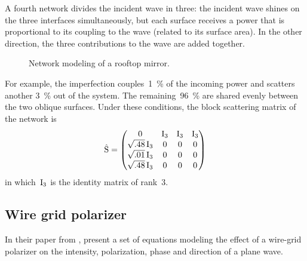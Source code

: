 A fourth network divides the incident wave in three: the incident wave shines on the three interfaces simultaneously, but each surface receives a power that is proportional to its coupling to the wave (related to its surface area).
In the other direction, the three contributions to the wave are added together.

\begin{figure}[hbtp]
    \centering
    
    \caption{Network modeling of a rooftop mirror.}
    \label{fig:rooftop_networks}
\end{figure}

For example, the imperfection couples~\SI{1}{\percent} of the incoming power and scatters another \SI{3}{\percent} out of the system.
The remaining~\SI{96}{\percent} are shared evenly between the two oblique surfaces.
Under these conditions, the block scattering matrix of the network is
\begin{equation}
    \hat{\mathrm{S}}
    =
    \begin{pmatrix}
        0                    & \mathrm{I}_3 & \mathrm{I}_3 & \mathrm{I}_3\\
        \sqrt{.48}\,\mathrm{I}_3 & 0 & 0 & 0\\ 
        \sqrt{.01}\,\mathrm{I}_3 & 0 & 0 & 0\\
        \sqrt{.48}\,\mathrm{I}_3 & 0 & 0 & 0
    \end{pmatrix}
\end{equation}
in which~$\mathrm{I}_3$ is the identity matrix of rank~3.





\subsection{Wire grid polarizer}
\label{sec:wire_grid_polarizer}
In their paper from \citeyear{houde_2001} , \textcite{houde_2001} present a set of equations modeling the effect of a wire-grid polarizer on the intensity, polarization, phase and direction of a plane wave.

